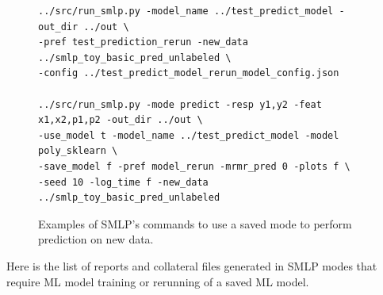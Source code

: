 \documentclass[a4paper,parskip=half]{article} %
\begin{document}
\begin{figure}%
\begin{verbatim}
../src/run_smlp.py -model_name ../test_predict_model -out_dir ../out \ 
-pref test_prediction_rerun -new_data ../smlp_toy_basic_pred_unlabeled \
-config ../test_predict_model_rerun_model_config.json 

../src/run_smlp.py -mode predict -resp y1,y2 -feat x1,x2,p1,p2 -out_dir ../out \ 
-use_model t -model_name ../test_predict_model -model poly_sklearn \
-save_model f -pref model_rerun -mrmr_pred 0 -plots f \
-seed 10 -log_time f -new_data ../smlp_toy_basic_pred_unlabeled

\end{verbatim}
\caption{Examples of SMLP's commands to use a saved mode to perform prediction on new data.}
\label{fig:pred:rerun:saved}
\end{figure}

Here is the list of reports and collateral files generated in SMLP modes that require ML model training or rerunning 
of a saved ML model.
\end{document}
